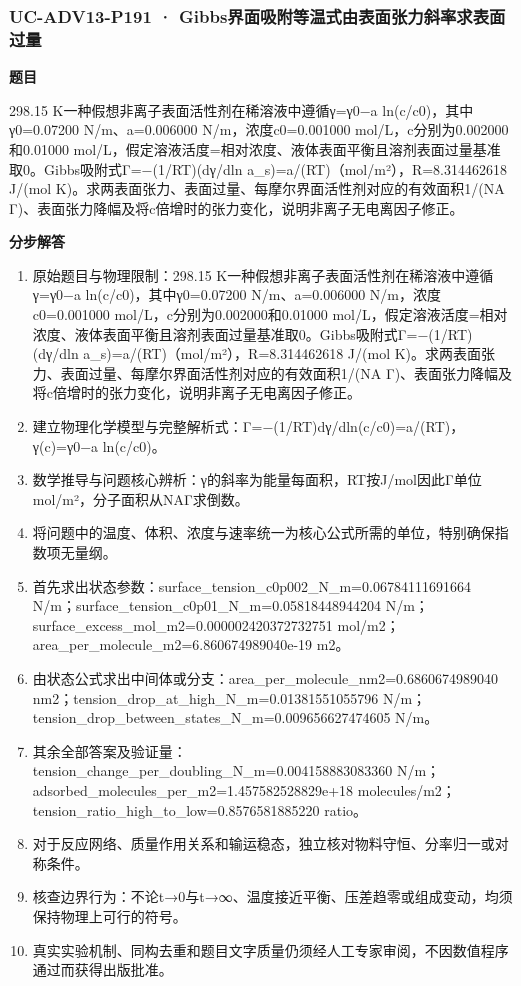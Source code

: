 \documentclass[UTF8,11pt,a4paper]{ctexart}
\begin{document}
\subsubsection*{UC-ADV13-P191 · Gibbs界面吸附等温式由表面张力斜率求表面过量}
\noindent\textbf{题目}\par
298.15 K一种假想非离子表面活性剂在稀溶液中遵循γ=γ0−a ln(c/c0)，其中γ0=0.07200 N/m、a=0.006000 N/m，浓度c0=0.001000 mol/L，c分别为0.002000和0.01000 mol/L，假定溶液活度=相对浓度、液体表面平衡且溶剂表面过量基准取0。Gibbs吸附式Γ=−(1/RT)(dγ/dln a\_s)=a/(RT)（mol/m²），R=8.314462618 J/(mol K)。求两表面张力、表面过量、每摩尔界面活性剂对应的有效面积1/(NA Γ)、表面张力降幅及将c倍增时的张力变化，说明非离子无电离因子修正。\par
\medskip\noindent\textbf{分步解答}
\begin{enumerate}
\item 原始题目与物理限制：298.15 K一种假想非离子表面活性剂在稀溶液中遵循γ=γ0−a ln(c/c0)，其中γ0=0.07200 N/m、a=0.006000 N/m，浓度c0=0.001000 mol/L，c分别为0.002000和0.01000 mol/L，假定溶液活度=相对浓度、液体表面平衡且溶剂表面过量基准取0。Gibbs吸附式Γ=−(1/RT)(dγ/dln a\_s)=a/(RT)（mol/m²），R=8.314462618 J/(mol K)。求两表面张力、表面过量、每摩尔界面活性剂对应的有效面积1/(NA Γ)、表面张力降幅及将c倍增时的张力变化，说明非离子无电离因子修正。
\item 建立物理化学模型与完整解析式：Γ=−(1/RT)dγ/dln(c/c0)=a/(RT)，γ(c)=γ0−a ln(c/c0)。
\item 数学推导与问题核心辨析：γ的斜率为能量每面积，RT按J/mol因此Γ单位mol/m²，分子面积从NAΓ求倒数。
\item 将问题中的温度、体积、浓度与速率统一为核心公式所需的单位，特别确保指数项无量纲。
\item 首先求出状态参数：surface\_tension\_c0p002\_N\_m=0.06784111691664 N/m；surface\_tension\_c0p01\_N\_m=0.05818448944204 N/m；surface\_excess\_mol\_m2=0.000002420372732751 mol/m2；area\_per\_molecule\_m2=6.860674989040e-19 m2。
\item 由状态公式求出中间体或分支：area\_per\_molecule\_nm2=0.6860674989040 nm2；tension\_drop\_at\_high\_N\_m=0.01381551055796 N/m；tension\_drop\_between\_states\_N\_m=0.009656627474605 N/m。
\item 其余全部答案及验证量：tension\_change\_per\_doubling\_N\_m=0.004158883083360 N/m；adsorbed\_molecules\_per\_m2=1.457582528829e+18 molecules/m2；tension\_ratio\_high\_to\_low=0.8576581885220 ratio。
\item 对于反应网络、质量作用关系和输运稳态，独立核对物料守恒、分率归一或对称条件。
\item 核查边界行为：不论t→0与t→∞、温度接近平衡、压差趋零或组成变动，均须保持物理上可行的符号。
\item 真实实验机制、同构去重和题目文字质量仍须经人工专家审阅，不因数值程序通过而获得出版批准。
\end{enumerate}
\end{document}
